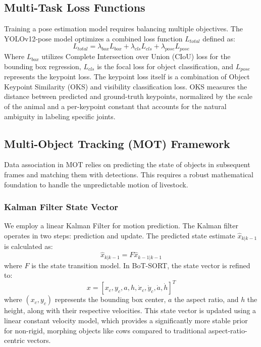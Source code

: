 \documentclass[conference]{IEEEtran}
\begin{document}
\subsection{Multi-Task Loss Functions}
Training a pose estimation model requires balancing multiple objectives. The YOLOv12-pose model optimizes a combined loss function $L_{total}$ defined as:
\begin{equation}
    L_{total} = \lambda_{box} L_{box} + \lambda_{cls} L_{cls} + \lambda_{pose} L_{pose}
\end{equation}
Where $L_{box}$ utilizes Complete Intersection over Union (CIoU) loss for the bounding box regression, $L_{cls}$ is the focal loss for object classification, and $L_{pose}$ represents the keypoint loss. The keypoint loss itself is a combination of Object Keypoint Similarity (OKS) and visibility classification loss. OKS measures the distance between predicted and ground-truth keypoints, normalized by the scale of the animal and a per-keypoint constant that accounts for the natural ambiguity in labeling specific joints.

\subsection{Multi-Object Tracking (MOT) Framework}
Data association in MOT relies on predicting the state of objects in subsequent frames and matching them with detections. This requires a robust mathematical foundation to handle the unpredictable motion of livestock.

\subsubsection{Kalman Filter State Vector}
We employ a linear Kalman Filter for motion prediction. The Kalman filter operates in two steps: prediction and update. The predicted state estimate $\hat{x}_{k|k-1}$ is calculated as:
\begin{equation}
    \hat{x}_{k|k-1} = F \hat{x}_{k-1|k-1}
\end{equation}
where $F$ is the state transition model. In BoT-SORT, the state vector is refined to:
\begin{equation}
    x = [x_c, y_c, a, h, \dot{x}_c, \dot{y}_c, \dot{a}, \dot{h}]^T
\end{equation}
where $(x_c, y_c)$ represents the bounding box center, $a$ the aspect ratio, and $h$ the height, along with their respective velocities. This state vector is updated using a linear constant velocity model, which provides a significantly more stable prior for non-rigid, morphing objects like cows compared to traditional aspect-ratio-centric vectors.
\end{document}
